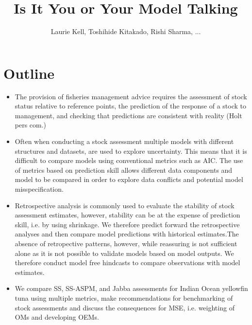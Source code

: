 \documentclass[a4paper]{article}
\title{Is It You or Your Model Talking}
\author{Laurie Kell, Toshihide Kitakado, Rishi Sharma, ...}
\begin{document}
\maketitle
 
\section*{Outline}

\begin{itemize}
    \item The provision of fisheries management advice requires the assessment of stock status relative to reference points, the prediction of the response of a stock to management, and checking that predictions are consistent with reality (Holt pers com.)    
    \item Often when conducting a stock assessment multiple models with different structures and datasets, are used to explore uncertainty. This means that it is difficult to compare models using conventional metrics such as AIC. The use of metrics based on prediction skill allows different data components and model to be compared in order to explore data conflicts and potential model misspecification. %
    \item Retrospective analysis is commonly used to evaluate the stability of stock assessment estimates, however, stability can be at the expense of prediction skill, i.e. by using shrinkage. We therefore predict forward the retrospective analyses and then compare model predictions with historical estimates.The absence of retropective patterns, however, while reassuring is not sufficient alone as it is not possible to validate models based on model outputs. We therefore conduct model free hindcasts to compare observations with model estimates. 
    \item  We  compare SS, SS-ASPM, and Jabba assessments for Indian Ocean yellowfin tuna  using multiple metrics, make recommendations for benchmarking of stock assessments and discuss the consequences for MSE, i.e. weighting of OMs and developing OEMs.    
\end{itemize}

\tableofcontents 
\end{document}

